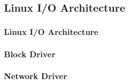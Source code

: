 \subsection{Linux I/O Architecture} %
\begin{frame}[fragile]
    \frametitle{Linux I/O Architecture}
\end{frame}
% 
% 
% 
\begin{frame}[fragile]
    \frametitle{Block Driver}
\end{frame}
% 
% 
\begin{frame}[fragile]
    \frametitle{Network Driver}
\end{frame}
% 
% 
